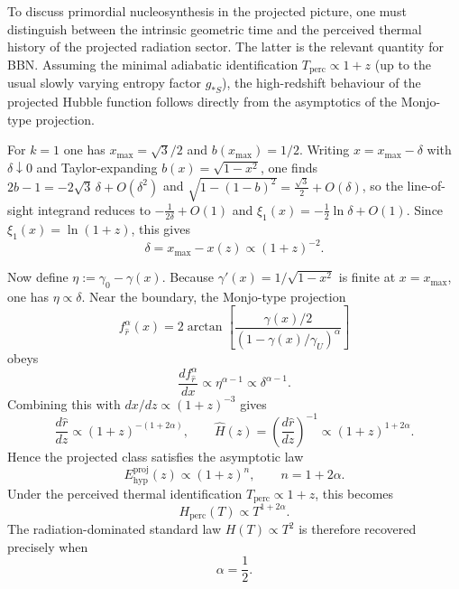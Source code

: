 \documentclass[preprint,12pt]{elsarticle}
\begin{document}
To discuss primordial nucleosynthesis in the projected picture, one must distinguish between the intrinsic geometric time and the perceived thermal history of the projected radiation sector. The latter is the relevant quantity for BBN. Assuming the minimal adiabatic identification $T_{\mathrm{perc}}\propto 1+z$ (up to the usual slowly varying entropy factor $g_{*S}$), the high-redshift behaviour of the projected Hubble function follows directly from the asymptotics of the Monjo-type projection.

For $k=1$ one has $x_{\max}=\sqrt{3}/2$ and $b(x_{\max})=1/2$. Writing $x=x_{\max}-\delta$ with $\delta\downarrow0$ and Taylor-expanding $b(x)=\sqrt{1-x^2}$, one finds $2b-1=-2\sqrt{3}\,\delta+O(\delta^2)$ and $\sqrt{1-(1-b)^2}=\frac{\sqrt{3}}{2}+O(\delta)$, so the line-of-sight integrand reduces to $-\frac{1}{2\delta}+O(1)$ and $\xi_1(x)=-\frac{1}{2}\ln\delta+O(1)$. Since $\xi_1(x)=\ln(1+z)$, this gives
\begin{equation}
\delta=x_{\max}-x(z)\propto (1+z)^{-2}.
\end{equation}

Now define $\eta:=\gamma_0-\gamma(x)$. Because $\gamma'(x)=1/\sqrt{1-x^2}$ is finite at $x=x_{\max}$, one has $\eta\propto\delta$. Near the boundary, the Monjo-type projection
\begin{equation}
f_{\hat r}^{\alpha}(x)=2\arctan\!\left[\frac{\gamma(x)/2}{(1-\gamma(x)/\gamma_U)^\alpha}\right]
\end{equation}
obeys
\begin{equation}
\frac{df_{\hat r}^{\alpha}}{dx}\propto \eta^{\alpha-1}\propto \delta^{\alpha-1}.
\end{equation}
Combining this with $dx/dz\propto (1+z)^{-3}$ gives
\begin{equation}
\frac{d\hat r}{dz}\propto (1+z)^{-(1+2\alpha)},
\qquad
\hat H(z)=\left(\frac{d\hat r}{dz}\right)^{-1}\propto (1+z)^{1+2\alpha}.
\end{equation}
Hence the projected class satisfies the asymptotic law
\begin{equation}
E_{\mathrm{hyp}}^{\mathrm{proj}}(z)\propto (1+z)^n,
\qquad n=1+2\alpha.
\end{equation}
Under the perceived thermal identification $T_{\mathrm{perc}}\propto 1+z$, this becomes
\begin{equation}
H_{\mathrm{perc}}(T)\propto T^{1+2\alpha}.
\end{equation}
The radiation-dominated standard law $H(T)\propto T^2$ is therefore recovered precisely when
\begin{equation}
\alpha=\frac12.
\end{equation}
\end{document}
